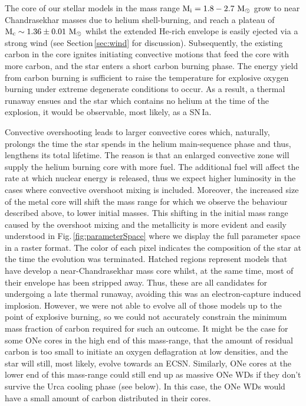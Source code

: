 \documentclass[../../main/thesis_msc.tex]{subfiles}
\begin{document}
    
    The core of our stellar models in the mass range $\rm M_i = 1.8 - 2.7 \ M_{\odot}$ grow to near Chandrasekhar masses due to helium shell-burning, and reach a plateau of $\rm M_c \sim 1.36 \pm 0.01 \ M_{\odot}$ whilst the extended He-rich envelope is easily ejected via a strong wind (see Section\,\ref{sec:wind} for discussion).
    Subsequently, the existing carbon in the core ignites initiating convective motions that feed the core with more carbon, and the star enters a short carbon burning phase. The energy yield from carbon burning is sufficient to raise the temperature for explosive oxygen burning under extreme degenerate conditions to occur. As a result, a thermal runaway ensues and the star which contains no helium at the time of the explosion, it would be observable, most likely, as a SN\,Ia.
    
    Convective overshooting leads to larger convective cores which, naturally, prolongs the time the star spends in the helium main-sequence phase and thus, lengthens its total lifetime. The reason is that an enlarged convective zone will supply the helium burning core with more fuel. The additional fuel will affect the rate at which nuclear energy is released, thus we expect higher luminosity in the cases where convective overshoot mixing is included. Moreover, the increased size of the metal core will shift the mass range for which we observe the behaviour described above, to lower initial masses. This shifting in the initial mass range caused by the overshoot mixing and the metallicity is more evident and easily understood in Fig.\,\ref{fig:parameterSpace} where we display the full parameter space in a raster format. The color of each pixel indicates the composition of the star at the time the evolution was terminated. Hatched regions represent models that have develop a near-Chandrasekhar mass core whilst, at the same time, most of their envelope has been stripped away. Thus, these are all candidates for undergoing a late thermal runaway, avoiding this was an electron-capture induced implosion. However, we were not able to evolve all of those models up to the point of explosive burning, so we could not accurately constrain the minimum mass fraction of carbon required for such an outcome. It might be the case for some ONe cores in the high end of this mass-range, that the amount of residual carbon is too small to initiate an oxygen deflagration at low densities, and the star will still, most likely, evolve towards an ECSN. Similarly, ONe cores at the lower end of this mass-range could still end up as massive ONe WDs if they don't survive the Urca cooling phase (see below). In this case, the ONe WDs would have a small amount of carbon distributed in their cores.
    
\end{document}
